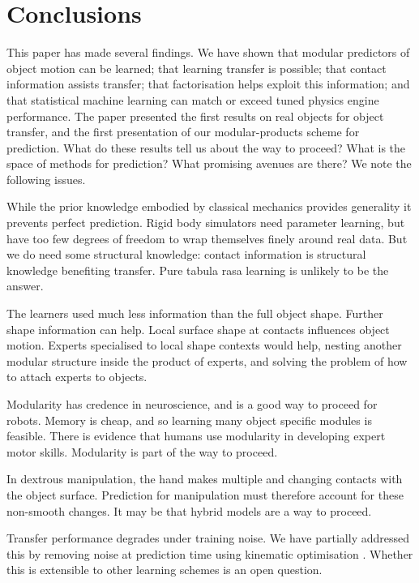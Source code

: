 
\section{Conclusions}\label{sec:Discussion}

This paper has made several findings. We have shown that modular predictors of object motion can be learned; that learning transfer is possible; that contact information assists transfer; that factorisation helps exploit this information; and that statistical machine learning can match or exceed tuned physics engine performance. The paper presented the first results on real objects for object transfer, and the first presentation of our modular-products scheme for prediction. What do these results tell us about the way to proceed? What is the space of methods for prediction? What promising avenues are there? We note the following issues.

 While the prior knowledge embodied by classical mechanics provides generality it prevents perfect prediction. Rigid body simulators need parameter learning, but have too few degrees of freedom to wrap themselves finely around real data. But we do need some structural knowledge: contact information is structural knowledge benefiting transfer. Pure tabula rasa learning is unlikely to be the answer. 

 The learners used much less information than the full object shape. Further shape information can help. Local surface shape at contacts influences object motion. Experts specialised to local shape contexts would help, nesting another modular structure inside the product of experts, and solving the problem of how to attach experts to objects.

 Modularity has credence in neuroscience, and is a good way to proceed for robots. Memory is cheap, and so learning many object specific modules is feasible. There is evidence that humans use modularity in developing expert motor skills. Modularity is part of the way to proceed.

  In dextrous manipulation, the hand makes multiple and changing contacts with the object surface. Prediction for manipulation must therefore account for these non-smooth changes. It may be that hybrid models are a way to proceed.

 Transfer performance degrades under training noise. We have partially addressed this by removing noise at prediction time using kinematic optimisation \cite{belter2014iros}. Whether this is extensible to other learning schemes is an open question.

